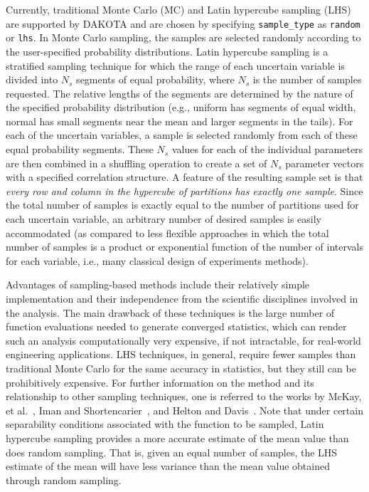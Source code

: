 Currently, traditional Monte Carlo (MC) and Latin hypercube sampling
(LHS) are supported by DAKOTA and are chosen by specifying
\texttt{sample\_type} as \texttt{random} or \texttt{lhs}. In Monte
Carlo sampling, the samples are selected randomly according to the
user-specified probability distributions. Latin hypercube sampling is
a stratified sampling technique for which the range of each uncertain
variable is divided into $N_{s}$ segments of equal probability, where
$N_{s}$ is the number of samples requested. The relative lengths of
the segments are determined by the nature of the specified probability
distribution (e.g., uniform has segments of equal width, normal has
small segments near the mean and larger segments in the tails). For
each of the uncertain variables, a sample is selected randomly from
each of these equal probability segments.  These $N_{s}$ values for
each of the individual parameters are then combined in a shuffling
operation to create a set of $N_{s}$ parameter vectors with a
specified correlation structure. A feature of the resulting sample set
is that 
\emph{every row and column in the hypercube of partitions has exactly one sample}.
Since the total number of samples is exactly equal
to the number of partitions used for each uncertain variable, an
arbitrary number of desired samples is easily accommodated (as
compared to less flexible approaches in which the total number of
samples is a product or exponential function of the number of
intervals for each variable, i.e., many classical design of
experiments methods).

Advantages of sampling-based methods include their relatively simple
implementation and their independence from the scientific disciplines
involved in the analysis. The main drawback of these techniques is the
large number of function evaluations needed to generate converged
statistics, which can render such an analysis computationally very
expensive, if not intractable, for real-world engineering
applications. LHS techniques, in general, require fewer samples than
traditional Monte Carlo for the same accuracy in statistics, but they
still can be prohibitively expensive. For further information on the
method and its relationship to other sampling techniques, one is
referred to the works by McKay, et al.~\cite{Mck79}, Iman and
Shortencarier~\cite{Ima84}, and Helton and Davis~\cite{Hel00}.
Note that under certain separability conditions associated with the 
function to be sampled,
Latin hypercube sampling provides a more accurate estimate of the mean
value than does random sampling. That is, given an equal number of
samples, the LHS estimate of the mean will have less variance than the
mean value obtained through random sampling.

